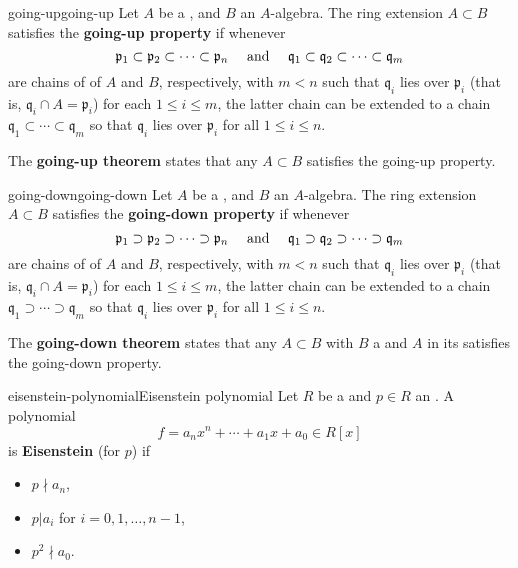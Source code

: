\begin{topic}{going-up}{going-up}
    Let $A$ be a , and $B$ an $A$-algebra. The ring extension $A \subset B$ satisfies the \textbf{going-up property} if whenever
    \[ \mathfrak{p}_1 \subset \mathfrak{p}_2 \subset \cdots \subset \mathfrak{p}_n \quad \textup{ and } \quad \mathfrak{q}_1 \subset \mathfrak{q}_2 \subset \cdots \subset \mathfrak{q}_m \]
    are chains of  of $A$ and $B$, respectively, with $m < n$ such that $\mathfrak{q}_i$ lies over $\mathfrak{p}_i$ (that is, $\mathfrak{q}_i \cap A = \mathfrak{p}_i$) for each $1 \le i \le m$, the latter chain can be extended to a chain $\mathfrak{q}_1 \subset \cdots \subset \mathfrak{q}_m$ so that $\mathfrak{q}_i$ lies over $\mathfrak{p}_i$ for all $1 \le i \le n$.
    
    The \textbf{going-up theorem} states that any  $A \subset B$ satisfies the going-up property.
\end{topic}

\begin{topic}{going-down}{going-down}
    Let $A$ be a , and $B$ an $A$-algebra. The ring extension $A \subset B$ satisfies the \textbf{going-down property} if whenever
    \[ \mathfrak{p}_1 \supset \mathfrak{p}_2 \supset \cdots \supset \mathfrak{p}_n \quad \textup{ and } \quad \mathfrak{q}_1 \supset \mathfrak{q}_2 \supset \cdots \supset \mathfrak{q}_m \]
    are chains of  of $A$ and $B$, respectively, with $m < n$ such that $\mathfrak{q}_i$ lies over $\mathfrak{p}_i$ (that is, $\mathfrak{q}_i \cap A = \mathfrak{p}_i$) for each $1 \le i \le m$, the latter chain can be extended to a chain $\mathfrak{q}_1 \supset \cdots \supset \mathfrak{q}_m$ so that $\mathfrak{q}_i$ lies over $\mathfrak{p}_i$ for all $1 \le i \le n$.
    
    The \textbf{going-down theorem} states that any  $A \subset B$ with $B$ a  and $A$  in its  satisfies the going-down property.
\end{topic}

\begin{topic}{eisenstein-polynomial}{Eisenstein polynomial}
    Let $R$ be a  and $p \in R$ an . A polynomial
    \[ f = a_n x^n + \cdots + a_1 x + a_0 \in R[x] \]
    is \textbf{Eisenstein} (for $p$) if
    \begin{itemize}
        \item $p \nmid a_n$,
        \item $p | a_i$ for $i = 0, 1, \ldots, n - 1$,
        \item $p^2 \nmid a_0$.
    \end{itemize}
\end{topic}

